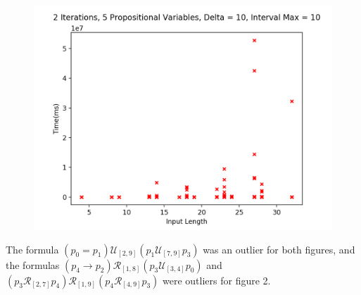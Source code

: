 \documentclass[runningheads]{llncs}
\begin{document}
\begin{minipage}{0.5 \textwidth}
    \begin{figure}[H]
    \centering
    \includegraphics[scale=0.39]{images/Sim1Time.png}
    \end{figure}
\end{minipage}%


\vspace{2mm}
\noindent The formula $(p_0 = p_1) \mathcal{U}_{[2,9]} (p_1 \mathcal{U}_{[7,9]} p_3)$ was an outlier for both figures, and the formulas $(p_4 \rightarrow p_2) \mathcal{R}_{[1,8]} (p_3 \mathcal{U}_{[3,4]} p_0)$ and $(p_3 \mathcal{R}_{[2,7]} p_4) \mathcal{R}_{[1,9]} (p_4 \mathcal{R}_{[4,9]} p_3)$ were outliers for figure 2. 
\end{document}
